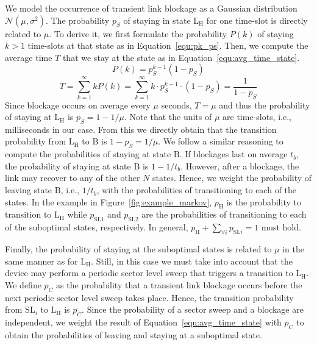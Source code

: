 \documentclass{article}
\begin{document}
We model the occurrence of transient link blockage as a Gaussian distribution $\mathcal{N}(\mu, \sigma^2)$. The probability $p_S$ of staying in state $\text{L}_\text{H}$ for one time-slot is directly related to $\mu$. To derive it, we first formulate the probability $P(k)$ of staying $k > 1$ time-slots at that state as in Equation~\ref{equ:pk_ps}. Then, we compute the average time $T$ that we stay at the state as in Equation~\ref{equ:avg_time_state}.
\begin{equation}
	P(k) = p_S^{k-1} (1-p_S)
\label{equ:pk_ps}
\end{equation}
\begin{equation}
	T = \displaystyle\sum_{k=1}^{\infty} k P(k) = \displaystyle\sum_{k=1}^{\infty} k \cdot p_S^{k-1} \cdot (1-p_S) = \frac{1}{1-p_S}
\label{equ:avg_time_state}
\end{equation}
Since blockage occurs on average every $\mu$ seconds, $T = \mu$ and thus the probability of staying at $\text{L}_\text{H}$ is $p_S = 1 - 1/\mu$. Note that the units of $\mu$ are time-slots, i.e., milliseconds in our case. From this we directly obtain that the transition probability from $\text{L}_\text{H}$ to $\text{B}$ is $1 - p_S = 1/\mu$. We follow a similar reasoning to compute the probabilities of staying at state $\text{B}$. If blockages last on average $t_b$, the probability of staying at state $\text{B}$ is $1 - 1/t_b$. However, after a blockage, the link may recover to any of the other $N$ states. Hence, we weight the probability of leaving state $\text{B}$, i.e., $1/t_b$, with the probabilities of transitioning to each of the states. In the example in Figure~\ref{fig:example_markov}, $p_\text{H}$ is the probability to transition to $\text{L}_\text{H}$ while $p_{\text{SL1}}$ and $p_{\text{SL2}}$ are the probabilities of transitioning to each of the suboptimal states, respectively. In general, $p_\text{H} + \sum_{\forall i} p_{\text{SL}i} = 1$ must hold.



Finally, the probability of staying at the suboptimal states is related to $\mu$ in the same manner as for $\text{L}_\text{H}$. Still, in this case we must take into account that the device may perform a periodic sector level sweep that triggers a transition to $\text{L}_\text{H}$. We define $p_C$ as the probability that a transient link blockage occurs before the next periodic sector level sweep takes place. Hence, the transition probability from $\text{SL}_i$ to $\text{L}_\text{H}$ is $\overline{p_C}$. Since the probability of a sector sweep and a blockage are independent, we weight the result of Equation~\ref{equ:avg_time_state} with $p_C$ to obtain the probabilities of leaving and staying at a suboptimal state.
\end{document}
